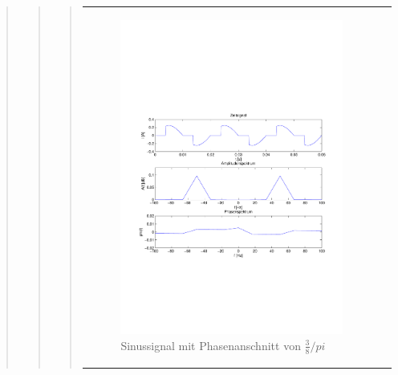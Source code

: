 \begin{quote}
\begin{quote}
\begin{quote}
\begin{center}
\begin{tabular}{ll}
\begin{minipage}{0.6\textwidth}
                    \end{minipage}
                    \begin{minipage}{0.6\textwidth}
    
                         \begin{figure}[H]
                            \label{fig:}
                            \includegraphics[scale=0.5, trim = 2cm 7cm 1.5cm 8.5cm, clip]{./Bilder/Phasenanschnitt38pi.pdf} %
                            \caption{Sinussignal mit Phasenanschnitt von $\frac{3}{8}/pi$}
                        \end{figure}
                   \vspace{-1.5em}
    
                    \end{minipage}
    

\end{tabular}
\end{center}
\end{quote}
\end{quote}
\end{quote}
